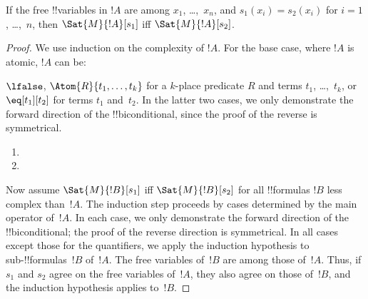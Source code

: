 \begin{prop}
If the free !!{variable}s in $!A$ are among $x_1$, \dots,~$x_n$, and
$s_1(x_i) = s_2(x_i)$ for $i = 1$, \dots,~$n$, then $\Sat{M}{!A}[s_1]$
iff $\Sat{M}{!A}[s_2]$.
\end{prop}

\begin{proof}
We use induction on the complexity of $!A$. For the base case, where
$!A$ is atomic, $!A$ can be:

$\lfalse$,
$\Atom{R}{t_1, \dots, t_k}$ for a $k$-place predicate $R$ and terms
$t_1$, \dots,~$t_k$, or $\eq[t_1][t_2]$ for terms $t_1$ and~$t_2$.
In the latter two cases, we only demonstrate the forward direction of
the !!{biconditional}, since the proof of the reverse is symmetrical.

\begin{enumerate}




\item
\item
\end{enumerate}

Now assume $\Sat{M}{!B}[s_1]$ iff $\Sat{M}{!B}[s_2]$ for all
!!{formula}s $!B$ less complex than~$!A$. The induction step proceeds
by cases determined by the main operator of~$!A$. In each case, we
only demonstrate the forward direction of the !!{biconditional}; the
proof of the reverse direction is symmetrical. In all cases except
those for the quantifiers, we apply the induction hypothesis to
sub-!!{formula}s~$!B$ of~$!A$.  The free variables of~$!B$ are among
those of~$!A$. Thus, if $s_1$ and $s_2$ agree on the free variables
of~$!A$, they also agree on those of~$!B$, and the induction
hypothesis applies to~$!B$.


\end{proof}
